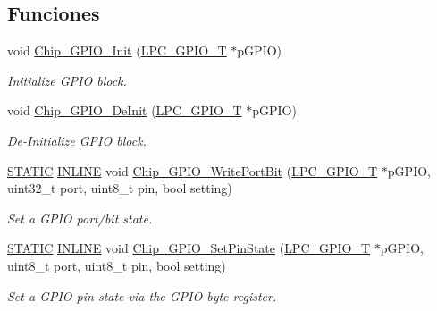 \subsection*{Funciones}
\begin{DoxyCompactItemize}
\item 
void \hyperlink{group___g_p_i_o__18_x_x__43_x_x_gad799db2a825ded50fc7998f228db1b24}{Chip\+\_\+\+G\+P\+I\+O\+\_\+\+Init} (\hyperlink{struct_l_p_c___g_p_i_o___t}{L\+P\+C\+\_\+\+G\+P\+I\+O\+\_\+T} $\ast$p\+G\+P\+IO)
\begin{DoxyCompactList}\small\item\em Initialize G\+P\+IO block. \end{DoxyCompactList}\item 
void \hyperlink{group___g_p_i_o__18_x_x__43_x_x_gab713ee553d3115b4484e77810f2737a5}{Chip\+\_\+\+G\+P\+I\+O\+\_\+\+De\+Init} (\hyperlink{struct_l_p_c___g_p_i_o___t}{L\+P\+C\+\_\+\+G\+P\+I\+O\+\_\+T} $\ast$p\+G\+P\+IO)
\begin{DoxyCompactList}\small\item\em De-\/\+Initialize G\+P\+IO block. \end{DoxyCompactList}\item 
\hyperlink{group___l_p_c___types___public___macros_ga10b2d890d871e1489bb02b7e70d9bdfb}{S\+T\+A\+T\+IC} \hyperlink{spifi__18xx__43xx_8h_a2eb6f9e0395b47b8d5e3eeae4fe0c116}{I\+N\+L\+I\+NE} void \hyperlink{group___g_p_i_o__18_x_x__43_x_x_ga4ce4cce2499df5cee49a591ee5be6a48}{Chip\+\_\+\+G\+P\+I\+O\+\_\+\+Write\+Port\+Bit} (\hyperlink{struct_l_p_c___g_p_i_o___t}{L\+P\+C\+\_\+\+G\+P\+I\+O\+\_\+T} $\ast$p\+G\+P\+IO, uint32\+\_\+t port, uint8\+\_\+t pin, bool setting)
\begin{DoxyCompactList}\small\item\em Set a G\+P\+IO port/bit state. \end{DoxyCompactList}\item 
\hyperlink{group___l_p_c___types___public___macros_ga10b2d890d871e1489bb02b7e70d9bdfb}{S\+T\+A\+T\+IC} \hyperlink{spifi__18xx__43xx_8h_a2eb6f9e0395b47b8d5e3eeae4fe0c116}{I\+N\+L\+I\+NE} void \hyperlink{group___g_p_i_o__18_x_x__43_x_x_ga2d8db9f0a52f061d64e8cada713ae03e}{Chip\+\_\+\+G\+P\+I\+O\+\_\+\+Set\+Pin\+State} (\hyperlink{struct_l_p_c___g_p_i_o___t}{L\+P\+C\+\_\+\+G\+P\+I\+O\+\_\+T} $\ast$p\+G\+P\+IO, uint8\+\_\+t port, uint8\+\_\+t pin, bool setting)
\begin{DoxyCompactList}\small\item\em Set a G\+P\+IO pin state via the G\+P\+IO byte register. \end{DoxyCompactList}\item 

\end{DoxyCompactItemize}

